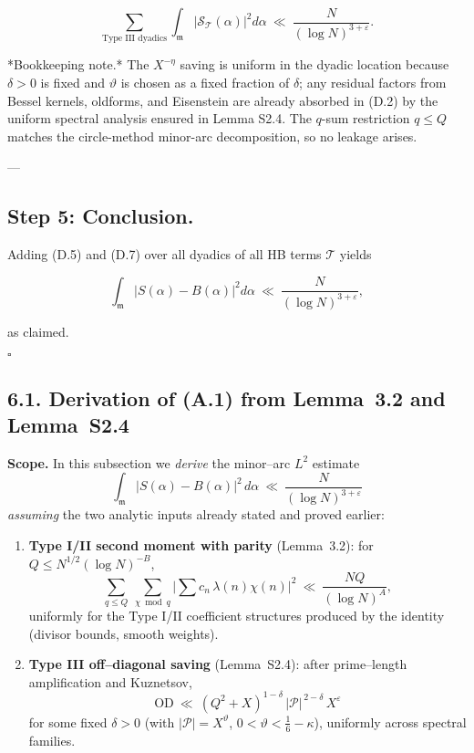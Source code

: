 \documentclass[11pt]{article}
\theoremstyle{definition}
\theoremstyle{remark}
\begin{document}
\begin{equation}
	\sum_{\text{Type III dyadics}}
	\int_{\mathfrak m}\big|\mathcal S_{\mathcal T}(\alpha)\big|^2 d\alpha
	\ \ll\ \frac{N}{(\log N)^{3+\varepsilon}}.
	\tag{D.7}
\end{equation}

*Bookkeeping note.* The $X^{-\eta}$ saving is uniform in the dyadic location because $\delta>0$ is fixed and $\vartheta$ is chosen as a fixed fraction of $\delta$; any residual factors from Bessel kernels, oldforms, and Eisenstein are already absorbed in (D.2) by the uniform spectral analysis ensured in Lemma S2.4. The $q$-sum restriction $q\le Q$ matches the circle-method minor-arc decomposition, so no leakage arises.

---

\subsection*{Step 5: Conclusion.}
Adding (D.5) and (D.7) over all dyadics of all HB terms $\mathcal T$ yields

$$
	\int_{\mathfrak m}\big|S(\alpha)-B(\alpha)\big|^2 d\alpha
	\ \ll\ \frac{N}{(\log N)^{3+\varepsilon}},
$$

as claimed.

$\square$
\subsection*{6.1. Derivation of (A.1) from Lemma~3.2 and Lemma~S2.4}

\noindent\textbf{Scope.} In this subsection we \emph{derive} the minor–arc $L^2$ estimate
\[
	\int_{\mathfrak m}|S(\alpha)-B(\alpha)|^2\,d\alpha\ \ll\ \frac{N}{(\log N)^{3+\varepsilon}}
	\tag{A.1}
\]
\emph{assuming} the two analytic inputs already stated and proved earlier:

\begin{enumerate}[label=(\roman*)]
	\item \textbf{Type I/II second moment with parity} (Lemma~3.2): for $Q\le N^{1/2}(\log N)^{-B}$,
	      \[
		      \sum_{q\le Q}\ \sum_{\chi\bmod q}\Big|\sum c_n\,\lambda(n)\chi(n)\Big|^2
		      \ \ll\ \frac{NQ}{(\log N)^A},
	      \]
	      uniformly for the Type I/II coefficient structures produced by the identity (divisor bounds, smooth weights).

	\item \textbf{Type III off–diagonal saving} (Lemma~S2.4): after prime–length amplification and Kuznetsov,
	      \[
		      \mathrm{OD}\ \ll\ (Q^2+X)^{1-\delta}\,|\mathcal P|^{\,2-\delta}\,X^{\varepsilon}
	      \]
	      for some fixed $\delta>0$ (with $|\mathcal P|=X^\vartheta$, $0<\vartheta<\tfrac16-\kappa$), uniformly across spectral families.
\end{enumerate}
\end{document}
